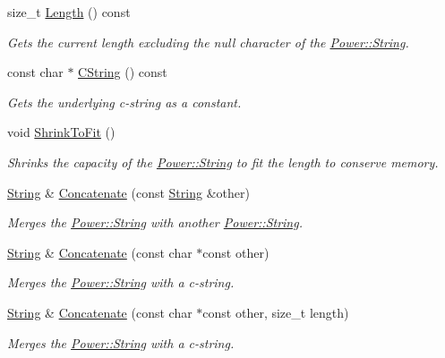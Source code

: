 \begin{DoxyCompactItemize}
size\+\_\+t \hyperlink{class_power_1_1_string_a04a9b77cf53b0421d4da863ec1d62707}{Length} () const
\begin{DoxyCompactList}\small\item\em Gets the current length excluding the null character of the \hyperlink{class_power_1_1_string}{Power\+::\+String}. \end{DoxyCompactList}\item 
const char $\ast$ \hyperlink{class_power_1_1_string_a8a0120f3e5dee6cb50be979f8b1175e4}{C\+String} () const
\begin{DoxyCompactList}\small\item\em Gets the underlying c-\/string as a constant. \end{DoxyCompactList}\item 
void \hyperlink{class_power_1_1_string_a5a787c065417773262c90e8da4e8e079}{Shrink\+To\+Fit} ()
\begin{DoxyCompactList}\small\item\em Shrinks the capacity of the \hyperlink{class_power_1_1_string}{Power\+::\+String} to fit the length to conserve memory. \end{DoxyCompactList}\item 
\hyperlink{class_power_1_1_string}{String} \& \hyperlink{class_power_1_1_string_aca4d6272dba914cf0fa66b69e615d0ab}{Concatenate} (const \hyperlink{class_power_1_1_string}{String} \&other)
\begin{DoxyCompactList}\small\item\em Merges the \hyperlink{class_power_1_1_string}{Power\+::\+String} with another \hyperlink{class_power_1_1_string}{Power\+::\+String}. \end{DoxyCompactList}\item 
\hyperlink{class_power_1_1_string}{String} \& \hyperlink{class_power_1_1_string_a366471411eb6e5eed0cc6b4754d740fb}{Concatenate} (const char $\ast$const other)
\begin{DoxyCompactList}\small\item\em Merges the \hyperlink{class_power_1_1_string}{Power\+::\+String} with a c-\/string. \end{DoxyCompactList}\item 
\hyperlink{class_power_1_1_string}{String} \& \hyperlink{class_power_1_1_string_a8e0ee550a677843cb4cf2eb855522711}{Concatenate} (const char $\ast$const other, size\+\_\+t length)
\begin{DoxyCompactList}\small\item\em Merges the \hyperlink{class_power_1_1_string}{Power\+::\+String} with a c-\/string. \end{DoxyCompactList}\item 

\end{DoxyCompactItemize}
